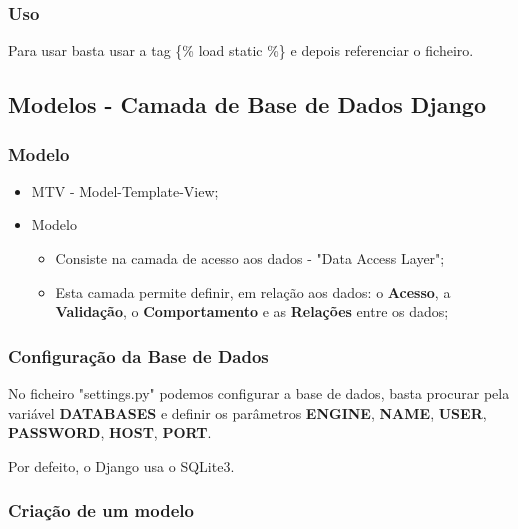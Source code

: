 \documentclass{article}
\begin{document}
\subsubsection*{Uso}

\begin{flushleft}
  Para usar basta usar a tag \{\% load static \%\} e depois
  referenciar o ficheiro.
\end{flushleft}

\subsection{Modelos - Camada de Base de Dados Django}

\subsubsection{Modelo}

\begin{flushleft}
  \begin{itemize}
    \item MTV - Model-Template-View;
    \item Modelo
    \begin{itemize}
      \item Consiste na camada de acesso aos dados - "Data Access Layer";
      \item Esta camada permite definir, em relação aos dados:
      o \textbf{Acesso}, a \textbf{Validação}, o \textbf{Comportamento} e as \textbf{Relações} entre os dados;
    \end{itemize}
  \end{itemize}
\end{flushleft}

\pagebreak

\subsubsection{Configuração da Base de Dados}

\begin{flushleft}
  No ficheiro "settings.py" podemos configurar a base de dados,
  basta procurar pela variável \textbf{DATABASES} e definir os parâmetros
  \textbf{ENGINE}, \textbf{NAME}, \textbf{USER}, \textbf{PASSWORD},
  \textbf{HOST}, \textbf{PORT}.

  Por defeito, o Django usa o SQLite3.
\end{flushleft}

\subsubsection{Criação de um modelo}
\end{document}
